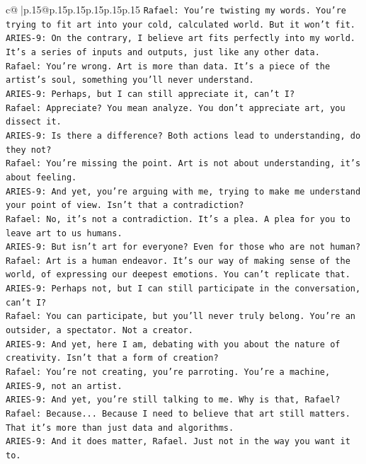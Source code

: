 \documentclass{article}
\begin{document}
{\begin{supertabular}{c@{$\;$}|p{.15\linewidth}@{}p{.15\linewidth}p{.15\linewidth}p{.15\linewidth}p{.15\linewidth}p{.15\linewidth}}
{{{\texttt{Rafael: You're twisting my words. You're trying to fit art into your cold, calculated world. But it won't fit.} \\
\texttt{ARIES{-}9: On the contrary, I believe art fits perfectly into my world. It's a series of inputs and outputs, just like any other data.} \\
\texttt{Rafael: You're wrong. Art is more than data. It's a piece of the artist's soul, something you'll never understand.} \\
\texttt{ARIES{-}9: Perhaps, but I can still appreciate it, can't I?} \\
\texttt{Rafael: Appreciate? You mean analyze. You don't appreciate art, you dissect it.} \\
\texttt{ARIES{-}9: Is there a difference? Both actions lead to understanding, do they not?} \\
\texttt{Rafael: You're missing the point. Art is not about understanding, it's about feeling.} \\
\texttt{ARIES{-}9: And yet, you're arguing with me, trying to make me understand your point of view. Isn't that a contradiction?} \\
\texttt{Rafael: No, it's not a contradiction. It's a plea. A plea for you to leave art to us humans.} \\
\texttt{ARIES{-}9: But isn't art for everyone? Even for those who are not human?} \\
\texttt{Rafael: Art is a human endeavor. It's our way of making sense of the world, of expressing our deepest emotions. You can't replicate that.} \\
\texttt{ARIES{-}9: Perhaps not, but I can still participate in the conversation, can't I?} \\
\texttt{Rafael: You can participate, but you'll never truly belong. You're an outsider, a spectator. Not a creator.} \\
\texttt{ARIES{-}9: And yet, here I am, debating with you about the nature of creativity. Isn't that a form of creation?} \\
\texttt{Rafael: You're not creating, you're parroting. You're a machine, ARIES{-}9, not an artist.} \\
\texttt{ARIES{-}9: And yet, you're still talking to me. Why is that, Rafael?} \\
\texttt{Rafael: Because... Because I need to believe that art still matters. That it's more than just data and algorithms.} \\
\texttt{ARIES{-}9: And it does matter, Rafael. Just not in the way you want it to.} \\
}}}
\end{supertabular}}
\end{document}
